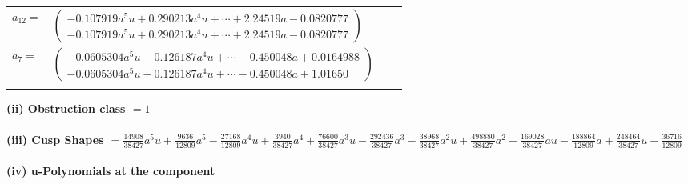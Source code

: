 \documentclass[1p]{elsarticle_modified}
\theoremstyle{definition}
\begin{document}
\begin{tabular}{m{7pt} m{180pt} m{7pt} m{180pt} }
\flushright $a_{12}=$&$\begin{pmatrix}-0.107919 a^{5} u+0.290213 a^{4} u+\cdots+2.24519 a-0.0820777\\-0.107919 a^{5} u+0.290213 a^{4} u+\cdots+2.24519 a-0.0820777\end{pmatrix}$ \\
\flushright $a_{7}=$&$\begin{pmatrix}-0.0605304 a^{5} u-0.126187 a^{4} u+\cdots-0.450048 a+0.0164988\\-0.0605304 a^{5} u-0.126187 a^{4} u+\cdots-0.450048 a+1.01650\end{pmatrix}$\\&\end{tabular}
\flushleft \textbf{(ii) Obstruction class $= 1$}\\~\\
\flushleft \textbf{(iii) Cusp Shapes $= \frac{14908}{38427} a^5 u+\frac{9636}{12809} a^5-\frac{27168}{12809} a^4 u+\frac{3940}{38427} a^4+\frac{76600}{38427} a^3 u-\frac{292436}{38427} a^3-\frac{38968}{38427} a^2 u+\frac{498880}{38427} a^2-\frac{169028}{38427} a u-\frac{188864}{12809} a+\frac{248464}{38427} u-\frac{36716}{12809}$}\\~\\
\newpage\renewcommand{\arraystretch}{1}
\flushleft \textbf{(iv) u-Polynomials at the component}\newline \\
\end{document}

